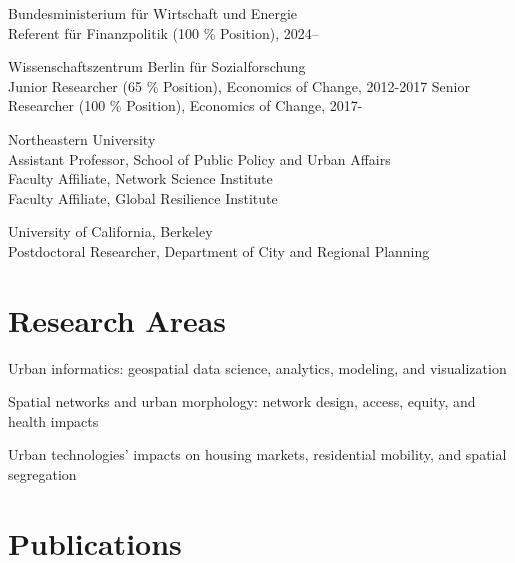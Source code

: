\documentclass[11pt,a4paper]{report} %
\newcommand{\listitemspace}{0.25em}
\renewenvironment{itemize}
{
  \begin{list}{}{\setlength{\leftmargin}{0em}
      \setlength{\parskip}{0em}
      \setlength{\itemsep}{\listitemspace}
  \setlength{\parsep}{\listitemspace}}}
  {
\end{list}}
\begin{document}
\begin{tablist}

\item[2024--]   \tab{}Bundesministerium für Wirtschaft und Energie \\
  Referent für Finanzpolitik (100 \% Position), 2024-- \\

\item[2012--2024]   \tab{}Wissenschaftszentrum Berlin für Sozialforschung \\
  Junior Researcher (65 \% Position), Economics of Change, 2012-2017  
  Senior Researcher (100 \% Position), Economics of Change, 2017- \\

\item[2018--19] \tab{}Northeastern University \\
  Assistant Professor, School of Public Policy and Urban Affairs \\
  Faculty Affiliate, Network Science Institute \\
  Faculty Affiliate, Global Resilience Institute

\item[2017--18] \tab{}University of California, Berkeley \\
  Postdoctoral Researcher, Department of City and Regional Planning

\end{tablist}

\section*{Research Areas}

\begin{itemize}

  \item Urban informatics: geospatial data science, analytics, modeling, and visualization
  \item Spatial networks and urban morphology: network design, access, equity, and health impacts
  \item Urban technologies' impacts on housing markets, residential mobility, and spatial segregation

\end{itemize}

\section*{Publications}
\end{document}
